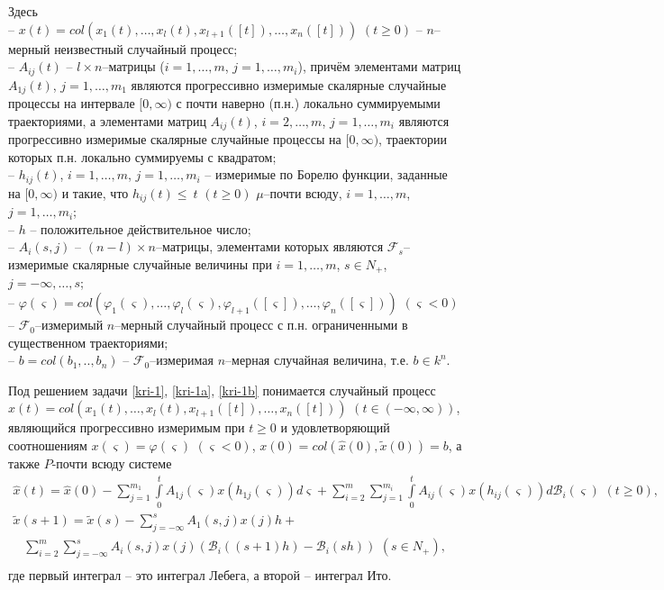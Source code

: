Здесь\\
\noindent
  -- $x(t) = col (x_1(t), \dots, x_l(t), x_{l+1}([t]), \dots,
x_n([t]))$ $ (t \ge 0)$  -- $n$--мерный неизвестный случайный
процесс;\\
  -- $A_{ij}(t)$ -- $l \times n$--матрицы ($i = 1,\dots,m$, $j =
1,\dots,m_i$), причём элементами матриц $A_{1j}(t)$, $j = 1,\dots,m_1$
являются прогрессивно измеримые скалярные случайные процессы на
интервале $[0, \infty)$ с почти наверно (п.н.) локально суммируемыми
траекториями, а элементами матриц $A_{ij}(t)$, $i = 2,\dots,m$, $j =
1,\dots,m_i$ являются прогрессивно измеримые скалярные случайные
процессы на $[0, \infty)$, траектории которых п.н. локально
суммируемы с квадратом;\\
  -- $ h_{ij}(t)$, $i = 1,\dots,m$, $j = 1,\dots,m_i$ -- измеримые по
Борелю функции, заданные на $[0, \infty)$ и такие, что $h_{ij}(t)
\leq \ t {\,} {\,} (t \geq 0)$ $\mu $--почти всюду, $i = 1,\dots,m$,
$j = 1,\dots,m_i$;\\
  -- $h$ -- положительное действительное число;\\
  -- $A_i(s,j)$ -- $(n-l)\times n$--матрицы, элементами которых являются
${\mathcal F}_s$--измеримые скалярные случайные величины при
$i=1,\dots,m$, $s\in N_+$, $j=-\infty ,\dots,s$;\\
  -- $\varphi (\varsigma ) = col (\varphi _1 (\varsigma),\dots, \varphi
_l (\varsigma), \varphi _{l+1} ([\varsigma]), \dots, \varphi _n
([\varsigma])) \, \, (\varsigma < 0)$ -- ${\mathcal F}_0$--измеримый
$n$--мерный случайный процесс с п.н. ограниченными в существенном
траекториями;\\
  -- $b = col (b_1,.., b_n)$ -- ${\mathcal F}_0$--измеримая
$n$--мерная случайная величина, т.е. $b \in k^n$.


\begin{definition}\label{kri-def1} Под решением задачи \eqref{kri-1}, \eqref{kri-1a}, \eqref{kri-1b}
понимается случайный процесс $x(t) = col (x_1(t), \dots, x_l(t),
x_{l+1}([t]), \dots, x_n([t]))\, \,(t \in (-\infty , \infty))$,
являющийся прогрессивно измеримым при  $t \ge 0$ и удовлетворяющий
соотношениям $x(\varsigma)=\varphi (\varsigma)\,\, (\varsigma < 0)$,
$x(0) = col (\hat x(0), \tilde x(0)) = b$, а также $P$-почти всюду
системе
$$
\begin{array}{crl}
 \hat x(t) =  \hat x(0)- \sum
 \limits_{j=1}^{m_1}\int \limits _0^tA_{1j}(\varsigma)x(h_{1j}(\varsigma))d\varsigma +
 \sum \limits_{i=2}^m\sum \limits_{j=1}^{m_i}
 \int \limits _0^t A_{ij}(\varsigma)x(h_{ij}(\varsigma))d\mathcal B_i(\varsigma) \,\, (t \ge
 0),\\
 \tilde x(s+1) = \tilde x(s) - \sum \limits _{j=-\infty }^{s}
A_{1}(s,j)x(j)h +
\end{array}
$$
$$
\begin{array}{crl}
\sum \limits _{i=2}^{m}\sum \limits _{j=-\infty }^{s}
A_{i}(s,j)x(j)(\mathcal B_i((s+1)h) - \mathcal B_i(sh)) \,\, (s
\in N_+),\\
\end{array}
$$
где первый интеграл -- это интеграл Лебега, а второй -- интеграл
Ито.
\end{definition}

